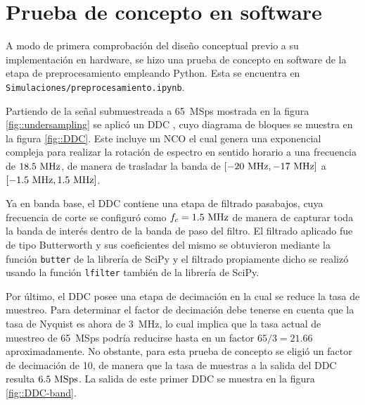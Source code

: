 \documentclass[../../main.tex]{subfiles}
\begin{document}



\section{Prueba de concepto en software}
A modo de primera comprobación del diseño conceptual previo a su implementación en hardware, se hizo una prueba de concepto en software de la etapa de preprocesamiento empleando Python. 
Esta se encuentra en \texttt{Simulaciones/preprocesamiento.ipynb}. 

Partiendo de la señal submuestreada a 65~MSps mostrada en la figura \ref{fig::undersampling} se aplicó un DDC \cite{DDC}, cuyo diagrama de bloques se muestra en la figura \ref{fig::DDC}. 
Este incluye un NCO el cual genera una exponencial compleja para realizar la rotación de espectro en sentido horario a una frecuencia de $18.5~\textrm{MHz}$, de manera de trasladar la banda de $[-20~\textrm{MHz}, -17~\textrm{MHz}]$ a $[-1.5~\textrm{MHz}, 1.5~\textrm{MHz}]$. 

Ya en banda base, el DDC contiene una etapa de filtrado pasabajos, cuya frecuencia de corte se configuró como $f_c = 1.5~\textrm{MHz}$ de manera de capturar toda la banda de interés dentro de la banda de paso del filtro. El filtrado aplicado fue de tipo Butterworth \cite{Butterworth} y sus coeficientes del mismo se obtuvieron mediante la función \texttt{butter} \cite{butter} de la librería de SciPy \cite{scipy} y el filtrado propiamente dicho se realizó usando la función \texttt{lfilter} \cite{lfilter} también de la librería de SciPy. 

Por último, el DDC posee una etapa de decimación en la cual se reduce la tasa de muestreo. Para determinar el factor de decimación debe tenerse en cuenta que la tasa de Nyquist \cite{Nyquist-rate} es ahora de 3~MHz, lo cual implica que la tasa actual de muestreo de 65~MSps podría reducirse hasta en un factor $65/3 = 21.66$ aproximadamente. 
No obstante, para esta prueba de concepto se eligió un factor de decimación de 10, de manera que la tasa de muestras a la salida del DDC resulta $6.5~\textrm{MSps}$. La salida de este primer DDC se muestra en la figura \ref{fig::DDC-band}.
\end{document}

